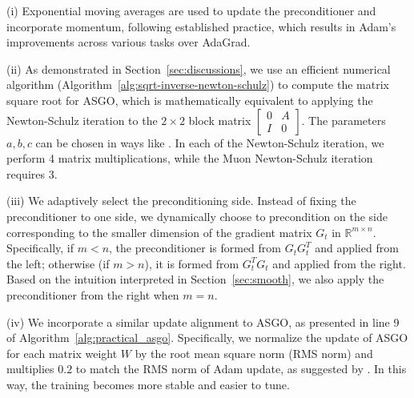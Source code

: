 \documentclass{article}
\theoremstyle{remark}
\begin{document}
(i) Exponential moving averages are used to update the preconditioner and incorporate momentum, following established practice, which results in Adam's improvements across various tasks over AdaGrad.

(ii) As demonstrated in Section~\ref{sec:discussions}, we use an efficient numerical algorithm (Algorithm~\ref{alg:sqrt-inverse-newton-schulz}) to compute the matrix square root for ASGO, which is mathematically equivalent to applying the Newton-Schulz iteration to the $2\times 2$ block matrix $\begin{bmatrix}
    0 & A \\ I & 0
\end{bmatrix}$. The parameters $a,b,c$ can be chosen in ways like \citet{jordan2024muon,amsel2025polar,grishina2025accelerating}. In each of the Newton-Schulz iteration, we perform 4 matrix multiplications, while the Muon Newton-Schulz iteration requires 3.  

(iii) We adaptively select the preconditioning side. Instead of fixing the preconditioner to one side, we dynamically choose to precondition on the side corresponding to the smaller dimension of the gradient matrix $G_t$ in $\mathbb R^{m \times n}$. Specifically, if $m < n$, the preconditioner is formed from $G_tG_t^T$ and applied from the left; otherwise (if $m > n$), it is formed from $G_t^TG_t$ and applied from the right. Based on the intuition interpreted in Section~\ref{sec:smooth}, we also apply the preconditioner from the right when $m=n$.

(iv) We incorporate a similar update alignment to ASGO, as presented in line 9 of Algorithm~\ref{alg:practical_asgo}. Specifically, we normalize the update of ASGO for each matrix weight $W$ by the root mean square norm (RMS norm) and multiplies $0.2$ to match the RMS norm of Adam update, as suggested by \citet{liu2025muon}. In this way, the training becomes more stable and easier to tune.
\end{document}
